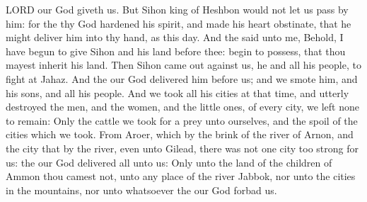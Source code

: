 {{{LORD}} our
God
giveth us.
But
Sihon
king of
Heshbon
would not let us
pass by him: for the
{} thy
God
hardened his
spirit, and made his
heart
obstinate, that he might
deliver him into thy
hand, as
{} this
day.
And the
{}
said unto me,
Behold, I have
begun to
give
Sihon and his
land
before thee:
begin to
possess, that thou mayest
inherit his
land.
Then
Sihon came
out
against us, he and all his
people, to
fight at
Jahaz.
And the
{} our
God
delivered him
before us; and we
smote him, and his
sons, and all his
people.
And we
took all his
cities at that
time, and utterly
destroyed the
men, and the
women, and the little
ones, of every
city, we
left none to
remain:
Only the
cattle we took for a
prey unto ourselves, and the
spoil of the
cities which we
took.
From
Aroer, which
{} by the
brink of the
river of
Arnon, and
{} the
city that
{} by the
river, even unto
Gilead, there was not one
city too
strong for us: the
{} our
God
delivered all unto
us:
Only unto the
land of the
children of
Ammon thou
camest not,
{} unto any
place of the
river
Jabbok, nor unto the
cities in the
mountains, nor unto whatsoever the
{} our
God
forbad us.

}

